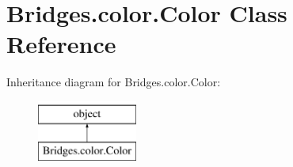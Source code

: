 \hypertarget{class_bridges_1_1color_1_1_color}{}\section{Bridges.\+color.\+Color Class Reference}
\label{class_bridges_1_1color_1_1_color}
Inheritance diagram for Bridges.\+color.\+Color\+:\begin{figure}[H]
\begin{center}
\leavevmode
\includegraphics[height=2.000000cm]{class_bridges_1_1color_1_1_color}
\end{center}
\end{figure}
